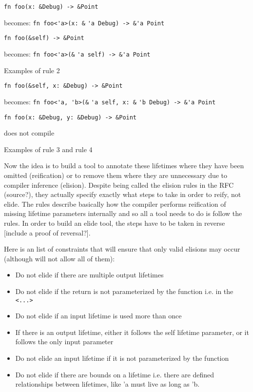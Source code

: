 \begin{fig}
\begin{verbatim}
fn foo(x: &Debug) -> &Point
\end{verbatim}
becomes: {\verb|fn foo<'a>(x: &|}
{\color{red} \verb|'a|}{\verb| Debug) -> &|}{\color{blue}\verb|'a|}{\verb| Point|}

\begin{verbatim}
fn foo(&self) -> &Point
\end{verbatim}
becomes: {\verb|fn foo<'a>(&|}
{\color{green} \verb|'a|}{\verb| self) -> &|}{\color{blue}\verb|'a|}{\verb| Point|}

\caption{Examples of rule 2}
\label{Fig:lifetimes}
\end{fig}

\begin{fig}
\begin{verbatim}
fn foo(&self, x: &Debug) -> &Point
\end{verbatim}
becomes: {\verb|fn foo<'a, 'b>(&|}
{\color{green} \verb|'a|}{\verb| self, x: &|}{\color{red} \verb|'b|}{\verb| Debug) -> &|}{\color{blue}\verb|'a|}{\verb| Point|}

\begin{verbatim}
fn foo(x: &Debug, y: &Debug) -> &Point
\end{verbatim}
does not compile

\caption{Examples of rule 3 and rule 4}
\label{Fig:lifetimes}
\end{fig}

Now the idea is to build a tool to annotate these lifetimes where they have been omitted (reification) or to remove them where they are unnecessary due to compiler inference (elision). Despite being called the elision rules in the RFC (source?), they actually specify exactly what steps to take in order to reify, not elide. The rules describe basically how the compiler performs reification of missing lifetime parameters internally and so all a tool needs to do is follow the rules. In order to build an elide tool, the steps have to be taken in reverse [include a proof of reversal?]. 

Here is an list of constraints that will ensure that only valid elisions may occur (although will not allow all of them):
\begin{itemize}
\item Do not elide if there are multiple output lifetimes
\item Do not elide if the return is not parameterized by the function i.e. in the {\verb|<...>|}
\item Do not elide if an input lifetime is used more than once
\item If there is an output lifetime, either it follows the self lifetime parameter, or it follows the only input parameter
\item Do not elide an input lifetime if it is not parameterized by the function
\item Do not elide if there are bounds on a lifetime i.e. there are defined relationships between lifetimes, like 'a must live as long as 'b.
\end{itemize}

